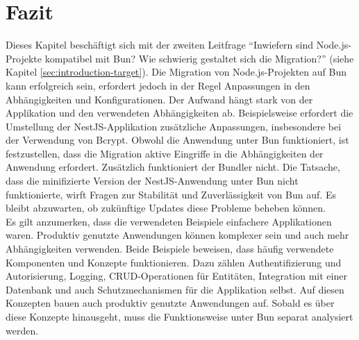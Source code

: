 \section{Fazit} \label{sec:compabitility-conclusion}
Dieses Kapitel beschäftigt sich mit der zweiten Leitfrage ``Inwiefern sind Node.js-Projekte kompatibel mit Bun? Wie schwierig gestaltet sich die Migration?'' (siehe Kapitel \ref{sec:introduction-target}). Die Migration von Node.js-Projekten auf Bun kann erfolgreich sein, erfordert jedoch in der Regel Anpassungen in den Abhängigkeiten und Konfigurationen. Der Aufwand hängt stark von der Applikation und den verwendeten Abhängigkeiten ab. Beispielsweise erfordert die Umstellung der NestJS-Applikation zusätzliche Anpassungen, insbesondere bei der Verwendung von Bcrypt. Obwohl die Anwendung unter Bun funktioniert, ist festzustellen, dass die Migration aktive Eingriffe in die Abhängigkeiten der Anwendung erfordert. Zusätzlich funktioniert der Bundler nicht.  Die Tatsache, dass die minifizierte Version der NestJS-Anwendung unter Bun nicht funktionierte, wirft Fragen zur Stabilität und Zuverlässigkeit von Bun auf. Es bleibt abzuwarten, ob zukünftige Updates diese Probleme beheben können.\\

\noindent
Es gilt anzumerken, dass die verwendeten Beispiele einfachere Applikationen waren. Produktiv genutzte Anwendungen können komplexer sein und auch mehr Abhängigkeiten verwenden. Beide Beispiele beweisen, dass häufig verwendete Komponenten und Konzepte funktionieren. Dazu zählen Authentifizierung und Autorisierung, Logging, CRUD-Operationen für Entitäten, Integration mit einer Datenbank und auch Schutzmechanismen für die Applikation selbst. Auf diesen Konzepten bauen auch produktiv genutzte Anwendungen auf. Sobald es über diese Konzepte hinausgeht, muss die Funktionsweise unter Bun separat analysiert werden.